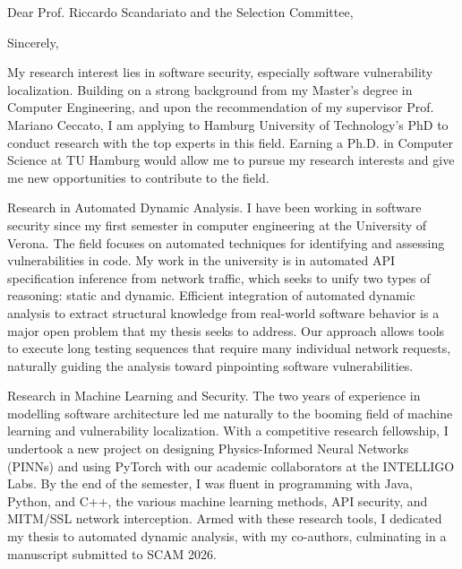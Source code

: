 \documentclass[11pt,a4paper,sans]{moderncv}
\begin{document}
\date{\today}
\opening{Dear Prof. Riccardo Scandariato and the Selection Committee,}
\closing{Sincerely,}

\makelettertitle

My research interest lies in software security, especially software vulnerability localization. %
Building on a strong background from my Master's degree in Computer Engineering, and upon the recommendation of my supervisor Prof. Mariano Ceccato, I am applying to Hamburg University of Technology's PhD to conduct research with the top experts in this field. %
Earning a Ph.D. in Computer Science at TU Hamburg would allow me to pursue my research interests and give me new opportunities to contribute to the field. %

Research in Automated Dynamic Analysis. %
I have been working in software security since my first semester in computer engineering at the University of Verona. %
The field focuses on automated techniques for identifying and assessing vulnerabilities in code. %
My work in the university is in automated API specification inference from network traffic, which seeks to unify two types of reasoning: static and dynamic. %
Efficient integration of automated dynamic analysis to extract structural knowledge from real-world software behavior is a major open problem that my thesis seeks to address. %
Our approach allows tools to execute long testing sequences that require many individual network requests, naturally guiding the analysis toward pinpointing software vulnerabilities. %

Research in Machine Learning and Security. %
The two years of experience in modelling software architecture led me naturally to the booming field of machine learning and vulnerability localization. %
With a competitive research fellowship, I undertook a new project on designing Physics-Informed Neural Networks (PINNs) and using PyTorch with our academic collaborators at the INTELLIGO Labs. %
By the end of the semester, I was fluent in programming with Java, Python, and C++, the various machine learning methods, API security, and MITM/SSL network interception. %
Armed with these research tools, I dedicated my thesis to automated dynamic analysis, with my co-authors, culminating in a manuscript submitted to SCAM 2026. %
\end{document}
